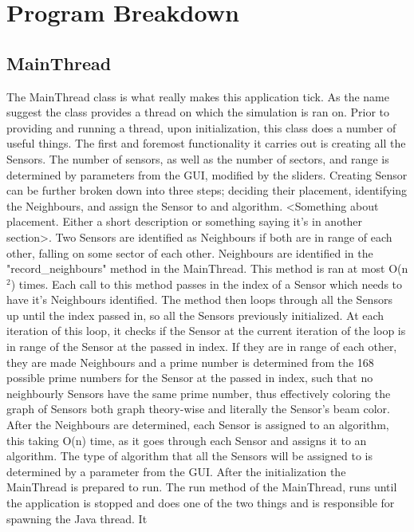 \section{Program Breakdown}

\subsection{MainThread}

The MainThread class is what really makes this application tick. As the name
suggest the class provides a thread on which the simulation is ran on. Prior to providing and running a thread, upon initialization, this class does a number of useful things. The first and foremost functionality it carries out is creating all
the Sensors. The number of sensors, as well as the number of sectors, and range is determined by parameters from the GUI, modified by the sliders. Creating Sensor
can be further broken down into three steps; deciding their placement, identifying the Neighbours, and assign the Sensor to and algorithm. <Something about
placement. Either a short description or something saying it's in another
section>.  Two Sensors are identified as Neighbours if both are in range of each other, falling on some sector of each other. Neighbours are identified in the
"record\_neighbours" method in the MainThread. This method is ran at most 
O(n$^{2}$)
times. Each call to this method passes in the index of a Sensor which needs to 
have it's Neighbours identified. The method then loops through all the Sensors up 
until the index passed in, so all the Sensors previously initialized. At each 
iteration of this loop, it checks if the Sensor at the current iteration of the 
loop is in range of the Sensor at the passed in index. If they are in range of 
each other, they are made Neighbours and a prime number is determined from the 168 
possible prime numbers for the Sensor at the passed in index, such that no 
neighbourly Sensors have the same prime number, thus effectively coloring the 
graph of Sensors both graph theory-wise and literally the Sensor's beam color. 
After the Neighbours are determined, each Sensor is assigned to an algorithm, this 
taking O(n) time, as it goes through each Sensor and assigns it to an algorithm. 
The type of algorithm that all the Sensors will be assigned to is determined by a 
parameter from the GUI. After the initialization the MainThread is prepared to 
run.  The run method of the MainThread, runs until the application is stopped and 
does one of the two things and is responsible for spawning the Java thread. It 

